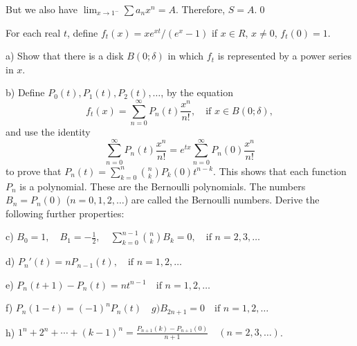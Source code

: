 But we also have \( \lim_{x \to 1^-} \sum a_n x^n = A \). Therefore, \( S = A \).\qed


\begin{problembox}
For each real \( t \), define \( f_t(x) = xe^{xt}/(e^x - 1) \) if \( x \in R \), \( x \neq 0 \), \( f_t(0) = 1 \).

a) Show that there is a disk \( B(0; \delta) \) in which \( f_t \) is represented by a power series in \( x \).

b) Define \( P_0(t), P_1(t), P_2(t), \ldots \), by the equation
\[f_t(x) = \sum_{n=0}^\infty P_n(t) \frac{x^n}{n!}, \quad \text{if } x \in B(0; \delta),\]
and use the identity
\[\sum_{n=0}^\infty P_n(t) \frac{x^n}{n!} = e^{tx} \sum_{n=0}^\infty P_n(0) \frac{x^n}{n!}\]
to prove that \( P_n(t) = \sum_{k=0}^n \binom{n}{k} P_k(0)t^{n-k} \). This shows that each function \( P_n \) is a polynomial. These are the Bernoulli polynomials. The numbers \( B_n = P_n(0) \) (\( n = 0, 1, 2, \ldots \)) are called the Bernoulli numbers. Derive the following further properties:

c) \( B_0 = 1, \quad B_1 = -\frac{1}{2}, \quad \sum_{k=0}^{n-1} \binom{n}{k} B_k = 0, \quad \text{if } n = 2, 3, \ldots \)

d) \( P_n'(t) = nP_{n-1}(t), \quad \text{if } n = 1, 2, \ldots \)

e) \( P_n(t + 1) - P_n(t) = nt^{n-1} \quad \text{if } n = 1, 2, \ldots \)

f) \( P_n(1 - t) = (-1)^n P_n(t) \quad g) B_{2n+1} = 0 \quad \text{if } n = 1, 2, \ldots \)

h) \( 1^n + 2^n + \cdots + (k - 1)^n = \frac{P_{n+1}(k) - P_{n+1}(0)}{n + 1} \quad (n = 2, 3, \ldots ) \).
\end{problembox}

